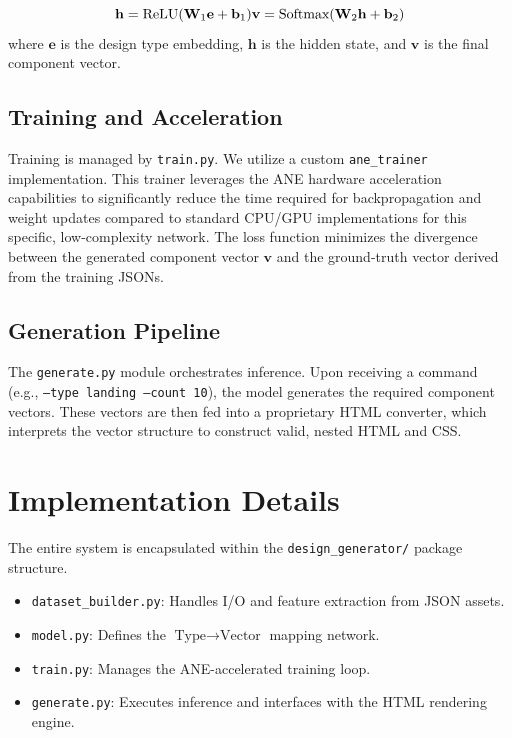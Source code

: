 \documentclass[11pt,a4paper]{article}
\begin{document}
$$
\mathbf{h} = \text{ReLU}(\mathbf{W}_1 \mathbf{e} + \mathbf{b}_1) \\
\mathbf{v} = \text{Softmax}(\mathbf{W}_2 \mathbf{h} + \mathbf{b}_2)
$$
where $\mathbf{e}$ is the design type embedding, $\mathbf{h}$ is the hidden state, and $\mathbf{v}$ is the final component vector.

\subsection{Training and Acceleration}
Training is managed by \texttt{train.py}. We utilize a custom \texttt{ane\_trainer} implementation. This trainer leverages the ANE hardware acceleration capabilities to significantly reduce the time required for backpropagation and weight updates compared to standard CPU/GPU implementations for this specific, low-complexity network. The loss function minimizes the divergence between the generated component vector $\mathbf{v}$ and the ground-truth vector derived from the training JSONs.

\subsection{Generation Pipeline}
The \texttt{generate.py} module orchestrates inference. Upon receiving a command (e.g., \texttt{--type landing --count 10}), the model generates the required component vectors. These vectors are then fed into a proprietary HTML converter, which interprets the vector structure to construct valid, nested HTML and CSS.

\section{Implementation Details}
The entire system is encapsulated within the \texttt{design\_generator/} package structure.

\begin{itemize}
    \item \texttt{dataset\_builder.py}: Handles I/O and feature extraction from JSON assets.
    \item \texttt{model.py}: Defines the $\text{Type} \rightarrow \text{Vector}$ mapping network.
    \item \texttt{train.py}: Manages the ANE-accelerated training loop.
    \item \texttt{generate.py}: Executes inference and interfaces with the HTML rendering engine.
\end{itemize}
\end{document}
